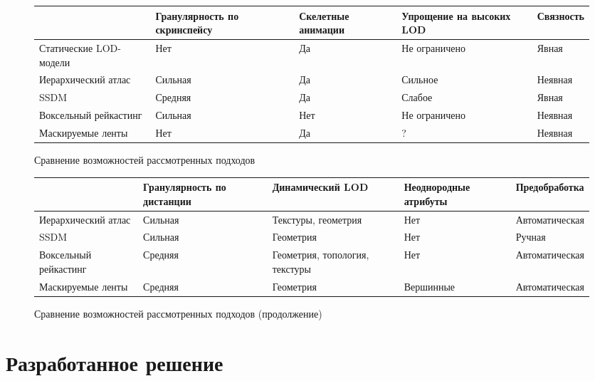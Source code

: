\documentclass[12pt]{extarticle}
\begin{document}
\begin{figure}[ht]
\small
\centering
\begin{tabular}{ p{24mm} | p{26mm} | p{18mm} | p{22mm} | p{16mm} }
                       & Гранулярность по скринспейсу & Скелетные анимации & Упрощение на высоких LOD & Связность \\
\hline
Статические LOD-модели & Нет                          & Да                 & Не ограничено            & Явная     \\
\hline
Иерархический атлас    & Сильная                      & Да                 & Сильное                  & Неявная   \\
\hline
SSDM                   & Средняя                      & Да                 & Слабое                   & Явная     \\
\hline
Воксельный рейкастинг  & Сильная                      & Нет                & Не ограничено            & Неявная   \\
\hline
Маскируемые ленты      & Нет                          & Да                 & ?                        & Неявная   \\
\end{tabular}
\caption{Сравнение возможностей рассмотренных подходов}
\end{figure}

\begin{figure}[ht]
\small
\centering
\begin{tabular}{ p{24mm} | p{24mm} | p{24mm} | p{24mm} | p{24mm} }
                      & Гранулярность по дистанции & Динамический LOD               & Неоднородные атрибуты & Предобработка \\
\hline
Иерархический атлас   & Сильная & Текстуры, геометрия            & Нет & Автоматическая \\
\hline
SSDM                  & Сильная & Геометрия                      & Нет & Ручная \\
\hline
Воксельный рейкастинг & Средняя & Геометрия, топология, текстуры & Нет & Автоматическая \\
\hline
Маскируемые ленты     & Средняя & Геометрия                      & Вершинные & Автоматическая \\
\end{tabular}
\caption{Сравнение возможностей рассмотренных подходов (продолжение)}
\end{figure}


\section{Разработанное решение}
\label{sec:algorithm}
\end{document}
